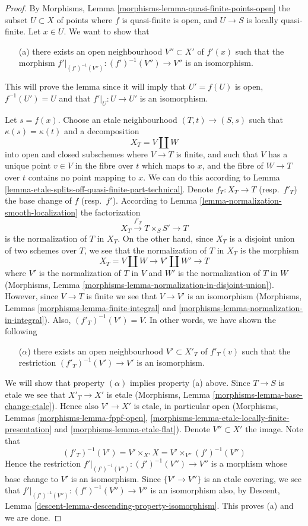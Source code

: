 \begin{proof}
By Morphisms, Lemma \ref{morphisms-lemma-quasi-finite-points-open}
the subset $U \subset X$ of points where $f$ is quasi-finite is open,
and $U \to S$ is locally quasi-finite. Let $x \in U$.
We want to show that
\begin{enumerate}
\item[(a)] there exists an open neighbourhood $V'' \subset X'$
of $f'(x)$ such that the morphism
$f'|_{(f')^{-1}(V'')} : (f')^{-1}(V'') \to V''$ is an isomorphism.
\end{enumerate}
This will prove the lemma since it will imply that $U' = f(U)$
is open, $f^{-1}(U') = U$ and that $f'|_U : U \to U'$ is an isomorphism.

\medskip\noindent
Let $s = f(x)$. Choose an etale neighbourhood $(T, t) \to (S, s)$ such that
$\kappa(s) = \kappa(t)$ and a decomposition
$$
X_T = V \coprod W
$$
into open and closed subschemes where $V \to T$ is finite, and such that
$V$ has a unique point $v \in V$ in the fibre over $t$ which maps to $x$,
and the fibre of $W \to T$ over $t$ contains no point mapping to $x$.
We can do this according to
Lemma \ref{lemma-etale-splits-off-quasi-finite-part-technical}.
Denote $f_T : X_T \to T$ (resp.\ $f'_T$) the base change of $f$
(resp.\ $f'$). According to
Lemma \ref{lemma-normalization-smooth-localization} the factorization
$$
X_T \xrightarrow{f'_T} T \times_S S' \longrightarrow T
$$
is the normalization of $T$ in $X_T$. On the other hand, since $X_T$
is a disjoint union of two schemes over $T$, we see that the normalization
of $T$ in $X_T$ is the morphism
$$
X_T = V \coprod W \longrightarrow V' \coprod W' \longrightarrow T
$$
where $V'$ is the normalization of $T$ in $V$ and $W'$ is the normalization
of $T$ in $W$
(Morphisms, Lemma \ref{morphisms-lemma-normalization-in-disjoint-union}).
However, since $V \to T$ is finite we see that $V \to V'$ is an isomorphism
(Morphisms, Lemmas \ref{morphisms-lemma-finite-integral}
and \ref{morphisms-lemma-normalization-in-integral}).
Also, $(f'_T)^{-1}(V') = V$. In other words, we have shown the following
\begin{enumerate}
\item[($\alpha$)] there exists an open neighbourhood $V' \subset X'_T$
of $f'_T(v)$ such that the restriction
$(f'_T)^{-1}(V') \to V'$ is an isomorphism.
\end{enumerate}
We will show that property $(\alpha)$ implies property (a) above.
Since $T \to S$ is etale we see that $X'_T \to X'$ is etale
(Morphisms, Lemma \ref{morphisms-lemma-base-change-etale}).
Hence also $V' \to X'$ is etale, in particular open
(Morphisms, Lemmas \ref{morphisms-lemma-fppf-open},
\ref{morphisms-lemma-etale-locally-finite-presentation}
and \ref{morphisms-lemma-etale-flat}). Denote
$V'' \subset X'$ the image. Note that
$$
(f'_T)^{-1}(V') = V' \times_{X'} X = V' \times_{V''} (f')^{-1}(V'')
$$
Hence the restriction $f'|_{(f')^{-1}(V'')} : (f')^{-1}(V'') \to V''$
is a morphism whose base change to $V'$ is an isomorphism. Since
$\{V' \to V''\}$ is an etale covering, we see that
$f'|_{(f')^{-1}(V'')} : (f')^{-1}(V'') \to V''$ is an isomorphism also,
by Descent, Lemma \ref{descent-lemma-descending-property-isomorphism}.
This proves (a) and we are done.
\end{proof}

